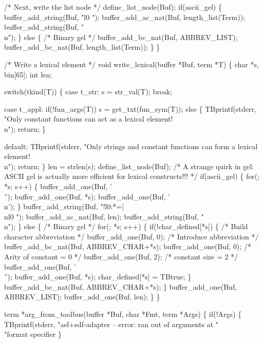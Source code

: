   /* Next, write the list node */
  define_list_node(Buf);
  if(ascii_gel)
    \{
      buffer_add_string(Buf, "l0 ");
      buffer_add_ac_nat(Buf, length_list(Term));
      buffer_add_string(Buf, "\\n");
    \}
  else
    \{
      /* Binary gel */
      buffer_add_bc_nat(Buf, ABBREV_LIST);
      buffer_add_bc_nat(Buf, length_list(Term));
    \}
\}

/* Write a lexical element */
void write_lexical(buffer *Buf, term *T)
\{
  char *s, bin[65];
  int len;

  switch(tkind(T))
    \{
    case t_str:
      s = str_val(T);
      break;

    case t_appl:
      if(!fun_args(T))
        s = get_txt(fun_sym(T));
      else
        \{
          TBprintf(stderr, 
                   "Only constant functions can act as a lexical element!\\n");
          return;
        \}
      
    default:
      TBprintf(stderr, 
               "Only strings and constant functions can form a lexical element!\\n");
      return;
    \}
  len = strlen(s);
  define_list_node(Buf);
  /* A strange quirk in gel: ASCII gel is actually more efficient
     for lexical constructs!!! */
  if(ascii_gel)
    \{
      for(; *s; s++)
        \{
          buffer_add_one(Buf, '\\'');
          buffer_add_one(Buf, *s);
          buffer_add_one(Buf, '\\n');
        \}
      buffer_add_string(Buf, "!l0:*=|\\nl0 ");
      buffer_add_ac_nat(Buf, len);      
      buffer_add_string(Buf, "\\n");
    \}
  else
    \{
      /* Binary gel */
      for(; *s; s++)
        \{
          if(!char_defined[*s])
            \{
              /* Build character abbreviation */
              buffer_add_one(Buf, 0); /* Introduce abbreviation */
              buffer_add_bc_nat(Buf, ABBREV_CHAR+*s);
              buffer_add_one(Buf, 0); /* Arity of constant = 0 */
              buffer_add_one(Buf, 2);    /* constant size = 2 */
              buffer_add_one(Buf, '\\'');
              buffer_add_one(Buf, *s);
              char_defined[*s] = TBtrue;
            \}
          buffer_add_bc_nat(Buf, ABBREV_CHAR+*s);
        \}
      buffer_add_one(Buf, ABBREV_LIST);
      buffer_add_one(Buf, len);
    \}
\}

term *arg_from_toolbus(buffer *Buf, char *Fmt, term *Args)
\{
  if(!Args)
    \{
      TBprintf(stderr, "asf+sdf-adapter -- error: ran out of arguments at " \\
               "format specifier %
    \}

